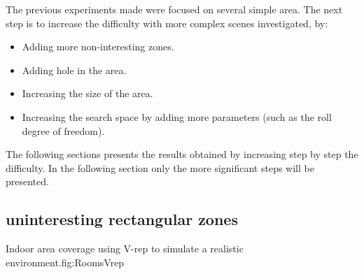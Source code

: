  The previous experiments made were focused on several simple area. The next step is to increase the difficulty  with more complex scenes investigated, by:
\begin{itemize}
\item Adding more non-interesting zones.
\item Adding hole in the area.
\item Increasing the size of the area.
\item Increasing the search space by adding more parameters (such as the roll degree of freedom). 
\end{itemize} 
The following sections presents the results obtained by increasing step by step the difficulty. %
In the following section only the more significant steps will be presented.

	\subsection{uninteresting  rectangular zones} \label{sec:expRectObstacle}
	\begin{mfigures}[!]{Indoor area coverage using V-rep to simulate a realistic environment.}{fig:RoomsVrep} \centering
{}
\hspace{1cm}
\hspace{1cm}

\tabsimuposeVrep
\end{mfigures}
	
